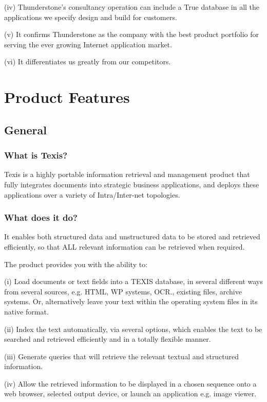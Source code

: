 (iv) Thunderstone's consultancy operation can include a True database in
all the applications we specify design and build for customers.

(v) It confirms Thunderstone as the company with the best product
portfolio for serving the ever growing Internet application market.

(vi) It differentiates us greatly from our competitors.

\chapter{Product Features}

\section{General}

\subsection{What is Texis?}

Texis is a highly portable information retrieval and management product that
fully integrates
documents into strategic business applications, and deploys these applications
over a variety of Intra/Inter-net topologies.

\subsection{What does it do?}

It enables both structured data and unstructured data to be stored and
retrieved efficiently, so that ALL relevant information can be retrieved
when required.

The product provides you with the ability to:

(i) Load documents or text fields into a TEXIS database, in several
different ways from several sources, e.g.  HTML, WP systems, OCR., existing
files, archive systems.  Or, alternatively leave your text within the
operating system files in its native format.

(ii) Index the text automatically, via several options, which enables the
text to be searched and retrieved efficiently and in a totally flexible
manner.

(iii) Generate queries that will retrieve the relevant textual and
structured information.

(iv) Allow the retrieved information to be displayed in a chosen sequence
onto a web browser, selected output device, or launch an application e.g.
image viewer.

